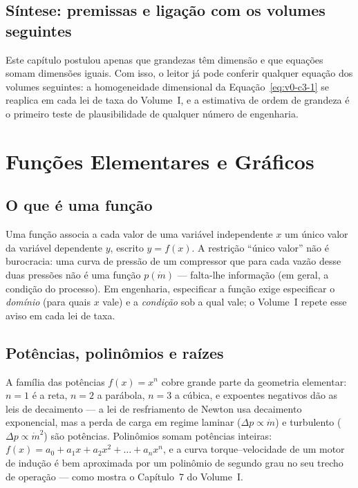\documentclass[12pt,a4paper]{article}
\numberwithin{equation}{section}
\numberwithin{table}{section}
\numberwithin{figure}{section}
\begin{document}
\subsection{Síntese: premissas e ligação com os volumes seguintes}

Este capítulo postulou apenas que grandezas têm dimensão e que equações
somam dimensões iguais. Com isso, o leitor já pode conferir qualquer
equação dos volumes seguintes: a homogeneidade dimensional da
Equação~\eqref{eq:v0-c3-1} se reaplica em cada lei de taxa do Volume~I, e a
estimativa de ordem de grandeza é o primeiro teste de plausibilidade de
qualquer número de engenharia.


\clearpage
\section{Funções Elementares e Gráficos}\label{sec:v0-funcoes}

\subsection{O que é uma função}

Uma função associa a cada valor de uma variável independente $x$ um único
valor da variável dependente $y$, escrito $y = f(x)$. A restrição ``único
valor'' não é burocracia: uma curva de pressão de um compressor que para
cada vazão desse duas pressões não é uma função $p(\dot{m})$ --- falta-lhe
informação (em geral, a condição do processo). Em engenharia, especificar a
função exige especificar o \emph{domínio} (para quais $x$ vale) e a
\emph{condição} sob a qual vale; o Volume~I repete esse aviso em cada lei
de taxa.

\subsection{Potências, polinômios e raízes}

A família das potências $f(x) = x^n$ cobre grande parte da geometria
elementar: $n=1$ é a reta, $n=2$ a parábola, $n=3$ a cúbica, e expoentes
negativos dão as leis de decaimento --- a lei de resfriamento de Newton usa
decaimento exponencial, mas a perda de carga em regime laminar
($\Delta p \propto \dot{m}$) e turbulento ($\Delta p \propto \dot{m}^2$)
são potências. Polinômios somam potências inteiras:
$f(x) = a_0 + a_1 x + a_2 x^2 + \dots + a_n x^n$, e a curva
torque--velocidade de um motor de indução é bem aproximada por um
polinômio de segundo grau no seu trecho de operação --- como mostra o
Capítulo~7 do Volume~I.
\end{document}
